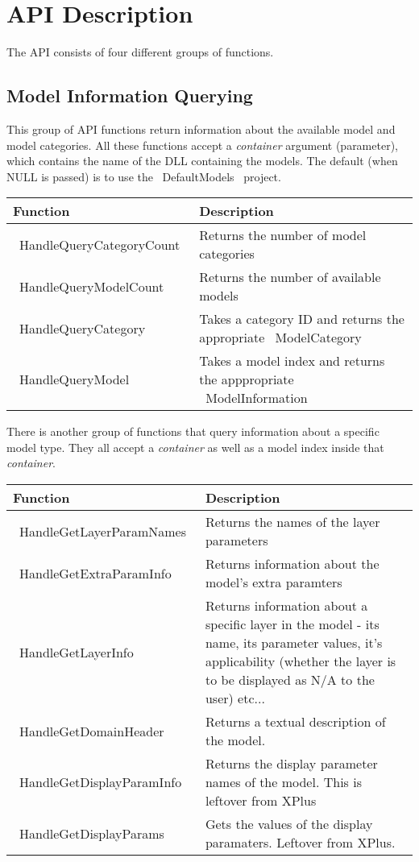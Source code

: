 \documentclass[12pt]{article}
\begin{document}
\section{API Description}
The API consists of four different groups of functions.

\subsection{Model Information Querying}
This group of API functions return information about the available model and model categories. All these functions accept a \emph{container} argument (parameter), which contains the name of the DLL containing the models. The default (when NULL is passed) is to use the ~DefaultModels~ project.

\begin{center}
	\begin{tabular}{|l|p{7.5cm}|}
		\hline
		\textbf{Function} & \textbf{Description} \\ \hline
		~HandleQueryCategoryCount~ & Returns the number of model categories \\ \hline
		~HandleQueryModelCount~ & Returns the number of available models \\ \hline
		~HandleQueryCategory~ & Takes a category ID and returns the appropriate ~ModelCategory~ \\ \hline
		~HandleQueryModel~ & Takes a model index and returns the apppropriate ~ModelInformation~ \\ \hline 
	\end{tabular}
\end{center}

There is another group of functions that query information about a specific model type. They all accept a \emph{container} as well as a model index inside that \emph{container}.

\begin{center}
	\begin{tabular}{|l|p{7.5cm}|}
		\hline
		\textbf{Function} & \textbf{Description} \\ \hline
		~HandleGetLayerParamNames~ & Returns the names of the layer parameters \\ \hline
		~HandleGetExtraParamInfo~ & Returns information about the model's extra paramters \\ \hline
		~HandleGetLayerInfo~ & Returns information about a specific layer in the model - its name, its parameter values, it's applicability (whether the layer is to be displayed as N/A to the user) etc...  \\ \hline
		~HandleGetDomainHeader~ & Returns a textual description of the model. \\ \hline
		~HandleGetDisplayParamInfo~ & Returns the display parameter names of the model. This is leftover from XPlus \\ \hline
		~HandleGetDisplayParams~ & Gets the values of the display paramaters. Leftover from XPlus. \\ \hline
	\end{tabular}
\end{center}
\end{document}
